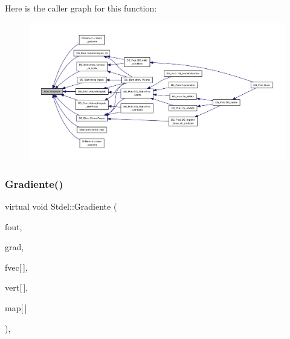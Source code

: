 Here is the caller graph for this function\+:
\nopagebreak
\begin{figure}[H]
\begin{center}
\leavevmode
\includegraphics[width=350pt]{classStdel_af3e65d1ad0d59ded925a3f5a9d0fb100_icgraph}
\end{center}
\end{figure}
\mbox{\label{classStdel_abf44e457d99e8c559c14cb1f7423da12}} 
\subsubsection{\texorpdfstring{Gradiente()}{Gradiente()}\hspace{0.1cm}{\footnotesize\ttfamily [5/6]}}
{\footnotesize\ttfamily virtual void Stdel\+::\+Gradiente (\begin{DoxyParamCaption}\item[{F\+I\+LE $\ast$}]{fout,  }\item[{double $\ast$$\ast$}]{grad,  }\item[{const double}]{fvec\mbox{[}$\,$\mbox{]},  }\item[{const \hyperlink{structVertice}{Vertice}}]{vert\mbox{[}$\,$\mbox{]},  }\item[{const int}]{map\mbox{[}$\,$\mbox{]} }\end{DoxyParamCaption})\hspace{0.3cm}{\ttfamily [pure virtual]}, {\ttfamily [inherited]}}

\mbox{\label{classStdel_aec200dfb0b00bebf70a1d845675eeafd}} 
